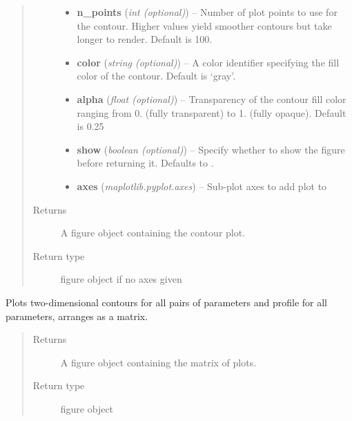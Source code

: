 \documentclass[a4paper,10pt,english]{sphinxmanual}
\begin{document}
\begin{fulllineitems}
\begin{fulllineitems}
\begin{quote}
\begin{description}
\begin{itemize}
\item {} 
\textbf{n\_points} (\emph{int (optional)}) --
Number of plot points to use for the contour. Higher
values yield smoother contours but take longer to
render. Default is 100.

\item {} 
\textbf{color} (\emph{string (optional)}) --
A  color identifier specifying the fill color
of the contour. Default is `gray'.

\item {} 
\textbf{alpha} (\emph{float (optional)}) --
Transparency of the contour fill color ranging from 0. (fully
transparent) to 1. (fully opaque). Default is 0.25

\item {} 
\textbf{show} (\emph{boolean (optional)}) --
Specify whether to show the figure before returning it. Defaults
to .

\item {} 
\textbf{axes} (\emph{maplotlib.pyplot.axes}) --
Sub-plot axes to add plot to

\end{itemize}

\item[{Returns}] \leavevmode
A figure object containing the contour plot.

\item[{Return type}] \leavevmode
{} figure object if no axes given

\end{description}\end{quote}

\end{fulllineitems}


\begin{fulllineitems}
\label{index:kafe.fit.Fit.plot_correlations}
Plots two-dimensional contours for all pairs of parameters
and profile for all parameters, arranges as a matrix.
\begin{quote}\begin{description}
\item[{Returns}] \leavevmode
A figure object containing the matrix of plots.

\item[{Return type}] \leavevmode
{} figure object

\end{description}\end{quote}


\end{fulllineitems}
\end{fulllineitems}
\end{document}
